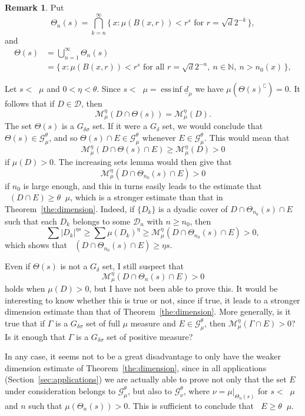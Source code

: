 \documentclass[11pt]{article}
\theoremstyle{definition}
\newtheorem{rema}[theo]{Remark}
\numberwithin{equation}{section}
\numberwithin{figure}{section}
\numberwithin{table}{section}
\DeclareMathOperator{\dimh}{dim_H}
\DeclareMathOperator{\ldimh}{\underline{dim}_H}
\DeclareMathOperator{\udimh}{\overline{dim}_H}
\DeclareMathOperator*{\essinf}{ess\,inf}
\begin{document}
\begin{rema}\label{rem:dimension}
Put
\[
\Theta_n (s) = \bigcap_{k=n}^\infty \{\, x : \mu (B (x,r)) < r^s
\text{ for } r = \sqrt{d} 2^{-k} \,\},
\]
and
\begin{align*}
\Theta (s) &= \bigcup_{n=1}^\infty \Theta_n (s)
\\ &= \{\, x : \mu (B (x,r)) < r^s \text{ for all } r = \sqrt{d} 2^{-n},\ n \in \mathbb{N},\ n> n_0 (x) \,\},
\end{align*}

Let $s < \ldimh \mu$ and $0 < \eta < \theta$. Since $s < \ldimh \mu = \essinf \underline{d}_\mu$ we have $\mu (\Theta(s)^\complement) = 0$. It follows that if $D \in \mathscr{D}$, then
\[
\mathscr{M}_\mu^\eta (D \cap \Theta (s)) =
\mathscr{M}_\mu^\eta (D).
\]
The set $\Theta (s)$ is a $G_{\delta \sigma}$ set. If it were a $G_\delta$ set, we would conclude that $\Theta (s) \in
\mathscr{G}_\mu^\theta$, and so $\Theta (s) \cap E \in
\mathscr{G}_\mu^\theta$ whenever $E \in
\mathscr{G}_\mu^\theta$. This would mean that
\[
\mathscr{M}_\mu^\eta (D \cap \Theta (s) \cap E) \geq
\mathscr{M}_\mu^\eta (D) > 0
\]
if $\mu (D) > 0$. The increasing sets lemma would then give that
\[
\mathscr{M}_\mu^\eta (D \cap \Theta_{n_0} (s) \cap E) > 0
\]
if $n_0$ is large enough, and this in turns easily leads to the estimate that $\dimh (D \cap E) \geq \theta \ldimh \mu$, which is a stronger estimate than that in Theorem~\ref{the:dimension}. Indeed, if $\{D_k\}$ is a dyadic cover of $D \cap \Theta_{n_0} (s) \cap E$ such that each $D_k$ belongs to some $\mathscr{D}_n$ with $n \geq n_0$, then
\[
\sum |D_k|^{\eta s} \geq \sum \mu (D_k)^\eta \geq
\mathscr{M}_\mu^\eta (D \cap \Theta_{n_0} (s) \cap E) > 0,
\]
which shows that $\dimh (D \cap \Theta_{n_0} (s) \cap E) \geq \eta s$.

Even if $\Theta (s)$ is not a $G_\delta$ set, I still suspect that
\[
\mathscr{M}_\mu^\eta (D \cap \Theta_n (s) \cap E) > 0
\]
holds when $\mu (D) > 0$, but I have not been able to prove this. It would be interesting to know whether this is true or not, since if true, it leads to a stronger dimension estimate than that of Theorem~\ref{the:dimension}. More generally, is it true that if $\Gamma$ is a $G_{\delta \sigma}$ set of full $\mu$ measure and $E
\in \mathscr{G}_\mu^\theta$, then $\mathscr{M}_\mu^\eta (\Gamma \cap E) > 0$? Is it enough that $\Gamma$ is a $G_{\delta \sigma}$ set of positive measure?

In any case, it seems not to be a great disadvantage to only have the weaker dimension estimate of Theorem~\ref{the:dimension}, since in all applications (Section~\ref{sec:applications}) we are actually able to prove not only that the set $E$ under consideration belongs to $\mathscr{G}_\mu^\theta$, but also to $\mathscr{G}_\nu^\theta$, where $\nu = \mu |_{\Theta_n (s)}$ for $s < \udimh \mu$ and $n$ such that $\mu (\Theta_n (s)) > 0$. This is sufficient to conclude that $\dimh E \geq \theta \udimh \mu$.
\end{rema}
\end{document}
